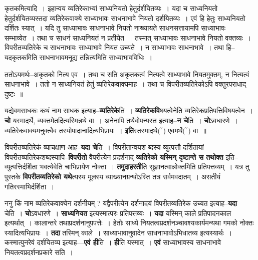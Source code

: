 \documentclass[article,12pt,a4paper]{memoir}
\newcommand{\unclear}[1]{($^{?}$#1)}
\begin{document}
	  \pstart कृतकमित्यादि । इहान्वय व्यतिरेकाभ्यां साध्यनियतो हेतुर्दर्शयितव्यः । यदा च साध्यनियतो हेतुर्दर्शयितव्यस्तदा व्यतिरेकवाक्ये साध्याभावः साधनाभावे नियतो दर्शयितव्यः । एवं हि हेतुः साध्यनियतो दर्शितः स्यात् । यदि तु साध्याभावः साधनाभावे नियतो नाख्यायते साधनसत्तायामपि साध्याभावः सम्भाव्येत । तथा च साधनं साध्यनियतं न प्रतीयेत । तस्मात् साध्याभावः साधनाभावे नियतो वक्तव्यः । विपरीतव्यतिरेके च साधनाभावः साध्याभावे नियत उच्यते । न साध्याभावः साधनाभावे । तथा हि--यदकृतकमिति साधनाभावमनूद्य तन्नित्यमिति साध्याभावविधिः ।
	\pend
        

	  \pstart ततोऽयमर्थः--अकृतको नित्य एव । तथा च सति अकृतकत्वं नित्यत्वे साध्याभावे नियतमुक्तम्, न नित्यत्वं साधनाभावे । ततो न साध्यनियतं हेतुं व्यतिरेकवाक्यमाह । तथा च विपरीतव्यतिरेकोऽपि वक्तुरपराधाद् दुष्टः ॥
	\pend
      
	  \endgroup
	

	  \pstart यद्येवमसाधकः कथं नाम साधक इत्याह--\textbf{व्यतिरेके}ति । \textbf{व्यतिरेकवि}षयत्वेनेति व्यतिरेकप्रतिपत्तिविषयत्वेन । \textbf{चो} यस्मादर्थे, व्यक्तमेतदित्यस्मिन्नथे वा । अनेनापि तथैवोपन्यस्त इत्याह--\textbf{न चे}ति । \textbf{चो}ऽवधारणे । व्यतिरेकवाक्यमनुक्त्वैव तस्योपादानादित्यभिप्रायः । \textbf{इति}स्तस्मादथे\unclear{} एवमर्थे\unclear{} वा ॥
	\pend
      

	  \pstart विपरीतव्यतिरेकं व्याचक्षाण आह--\textbf{यदा चे}ति । विपरीतान्वयश \leavevmode{} ब्दस्य व्युत्पत्तौ दर्शितायां विपरीतव्यतिरेकशब्दस्यापि--\textbf{विपरीतो} वैपरीत्येन प्रदर्शनाद् \textbf{व्यतिरेको यस्मिन् दृष्टान्ते स तथोक्त} इति--व्युत्पत्तिर्दर्शिता भवत्येवेति चाभिप्रायेण नोक्ता । \textbf{तमुदाहरती}ति सुज्ञानत्वान्नोक्तमिति प्रतिपत्तव्यम् । यत्र तु पुस्तके \textbf{विपरीतव्यतिरेको यथे}त्यस्य मूलस्य व्याख्यानग्रन्थोऽस्ति तत्र सर्वमवदातम् । असतीयं गतिरस्माभिर्दर्शिता ।
	\pend
      

	  \pstart ननु किं नाम व्यतिरेकवाक्येन दर्शनीयम् ? यद्वैपरीत्येन दर्शनादयं विपरीतव्यतिरेक उच्यत इत्याह--\textbf{यदा} चेति । \textbf{चो}ऽवधारणे । \textbf{साध्यनियत} इत्यस्मात्परः प्रतिपत्तव्यः । \textbf{यदा} यस्मिन् काले प्रतिपादनकाल इत्यर्थात् । कालान्तरे तथाप्रदर्शनानुपपत्तेः । हेतोः साध्ये नियतत्वप्रदर्शनञ्चावश्यकार्यमन्यथा गमको नोक्तः स्यादित्यभिप्रायः । \textbf{तदा} तस्मिन् काले । साध्याभावानुवादेन साधनाभावोऽभिधातव्य इत्यस्यार्थः । कस्मात्पुनरेवं दर्शयितव्य इत्याह—\textbf{एवं ही}ति । \textbf{ही}ति यस्मात् । \textbf{एवं} साध्याभावस्य साधनाभावे नियतत्वप्रदर्शनप्रकारे सति ।
	\pend
      
\end{document}
